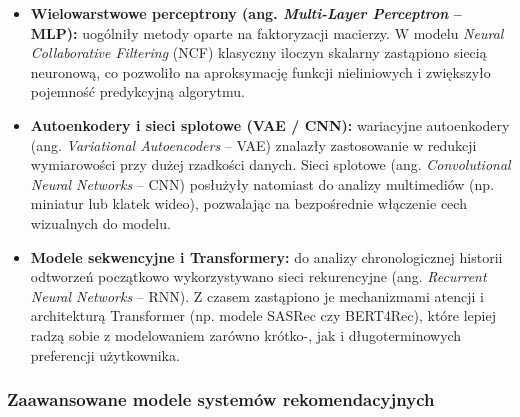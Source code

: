 \begin{itemize}
    \item \textbf{Wielowarstwowe perceptrony (ang. \foreignlanguage{english}{\textit{Multi-Layer Perceptron}} -- MLP):} uogólniły metody oparte na faktoryzacji macierzy. W modelu \foreignlanguage{english}{\textit{Neural Collaborative Filtering}} (NCF) klasyczny iloczyn skalarny zastąpiono siecią neuronową, co pozwoliło na aproksymację funkcji nieliniowych i zwiększyło pojemność predykcyjną algorytmu.

    \item \textbf{Autoenkodery i sieci splotowe (VAE / CNN):} wariacyjne autoenkodery (ang. \foreignlanguage{english}{\textit{Variational Autoencoders}} -- VAE) znalazły zastosowanie w redukcji wymiarowości przy dużej rzadkości danych. Sieci splotowe (ang. \foreignlanguage{english}{\textit{Convolutional Neural Networks}} -- CNN) posłużyły natomiast do analizy multimediów (np. miniatur lub klatek wideo), pozwalając na bezpośrednie włączenie cech wizualnych do modelu.

    \item \textbf{Modele sekwencyjne i Transformery:} do analizy chronologicznej historii odtworzeń początkowo wykorzystywano sieci rekurencyjne (ang. \foreignlanguage{english}{\textit{Recurrent Neural Networks}} -- RNN). Z czasem zastąpiono je mechanizmami atencji i architekturą Transformer (np. modele SASRec czy BERT4Rec), które lepiej radzą sobie z modelowaniem zarówno krótko-, jak i długoterminowych preferencji użytkownika.
\end{itemize}

\subsubsection{Zaawansowane modele systemów rekomendacyjnych}

